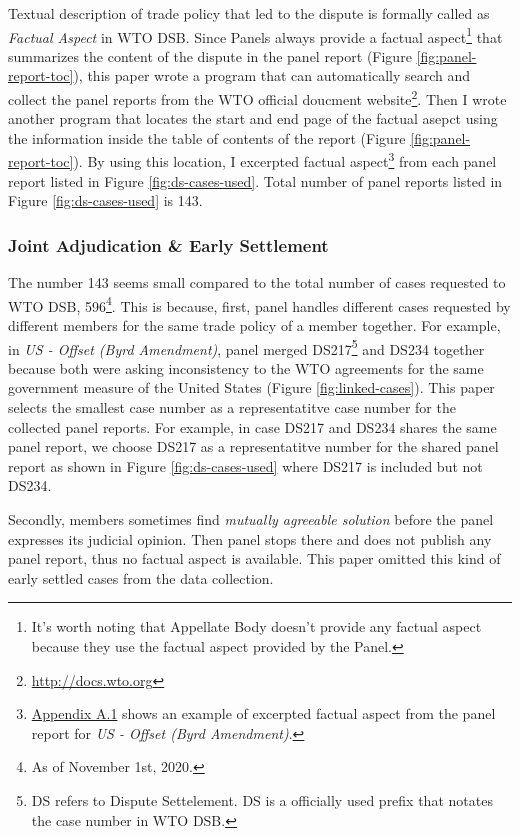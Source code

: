 Textual description of trade policy that 
led to the dispute is formally called as
\textit{Factual Aspect} in WTO DSB. 
Since Panels
always provide a factual aspect\footnote{
    It's worth noting that Appellate Body doesn't provide any factual aspect because they use the factual aspect provided by the Panel.
}
that summarizes the content of the dispute
in the panel report (Figure \ref{fig:panel-report-toc}),
this paper wrote a program that can 
automatically search and collect 
the panel reports from the WTO official doucment website\footnote{
    \url{http://docs.wto.org}
}.
Then I wrote another program that locates the start 
and end page of the factual asepct using the information inside the 
table of contents of the report (Figure \ref{fig:panel-report-toc}).
By using this location, I excerpted factual aspect\footnote{
    \hyperref[sub:factual-aspect-example]{Appendix A.1} shows an
    example of excerpted factual aspect from the panel report for \textit{US - Offset (Byrd Amendment)}.    
}
from each panel report listed in Figure \ref{fig:ds-cases-used}. 
Total number of panel reports listed in Figure \ref{fig:ds-cases-used} is 143.

\subsubsection{Joint Adjudication \& Early Settlement}

The number 143 seems small compared to the total number of cases requested to WTO DSB, 596\footnote
{
    As of November 1st, 2020.
}. This is because, first, panel handles different cases requested by different members
for the same trade policy of a member together. For example, in \textit{US - Offset (Byrd Amendment)}, panel merged DS217\footnote{
    DS refers to Dispute Settelement. DS is a officially used prefix that notates the case number in WTO DSB.
} and DS234 together because both were asking inconsistency to the WTO agreements for the same government measure of the United States (Figure \ref{fig:linked-cases}). This paper selects the smallest case number as a representatitve case number for the collected panel reports. For example, in case DS217 and DS234 shares the same panel report, we choose DS217 as a representatitve number for the shared panel report as shown in Figure \ref{fig:ds-cases-used} where DS217 is included but not DS234.

Secondly, members sometimes find \textit{mutually agreeable solution} before the panel expresses its judicial opinion. Then panel stops there and does not publish any panel report, thus no factual aspect is available. This paper omitted this kind of early settled cases from the data collection.

